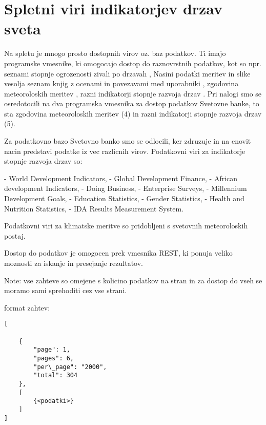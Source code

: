 \chapter{Spletni viri indikatorjev drzav sveta}

Na spletu je mnogo prosto dostopnih virov oz. baz podatkov. Ti imajo programske
vmesnike, ki omogocajo dostop do raznovrstnih podatkov, kot so npr. seznami 
stopnje ogrozenosti zivali po drzavah 
,
Nasini podatki meritev in slike vesolja
seznam knjig z ocenami in povezavami med uporabniki
,
zgodovina meteoroloskih meritev
,
razni indikatorji stopnje razvoja drzav
.
Pri nalogi smo se osredotocili na dva programska vmesnika za dostop podatkov 
Svetovne banke, to sta zgodovina meteoroloskih meritev (4) in razni 
indikatorji stopnje razvoja drzav (5).


% 
% 
% 
% 


Za podatkovno bazo Svetovno banko smo se odlocili, ker zdruzuje in na enovit
nacin predstavi podatke iz vec razlicnih virov. Podatkovni viri za indikatorje
stopnje razvoja drzav so:

- World Development Indicators, 
- Global Development Finance, 
- African development Indicators, 
- Doing Business,
- Enterprise Surveys, 
- Millennium Development Goals, 
- Education Statistics, 
- Gender Statistics,
- Health and Nutrition Statistics, 
- IDA Results Measurement System.

Podatkovni viri za klimatske meritve so pridobljeni s svetovnih meteoroloskih 
postaj.


Dostop do podatkov je omogocen prek vmesnika REST, ki ponuja veliko moznosti 
za iskanje in presejanje rezultatov. 


Note: vse zahteve so omejene s kolicino podatkov na stran in za dostop do vseh
se moramo sami sprehoditi cez vse strani.

format zahtev:

\begin{lstlisting}
[

    {
        "page": 1,
        "pages": 6,
        "per\_page": "2000",
        "total": 304
    },
    [
        {<podatki>}
	]
]
\end{lstlisting}





